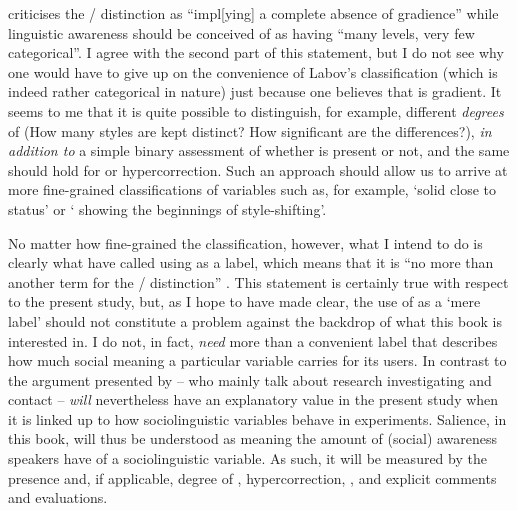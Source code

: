\textcite[6]{racz2013} criticises the / distinction as ``impl[ying] a complete absence of gradience'' while linguistic awareness should be conceived of as having ``many levels, very few categorical''.
I agree with the second part of this statement, but I do not see why one would have to give up on the convenience of Labov's classification (which is indeed rather categorical in nature) just because one believes that  is gradient.
It seems to me that it is quite possible to distinguish, for example, different \emph{degrees} of  (How many styles are kept distinct? How significant are the differences?), \emph{in addition to} a simple binary assessment of whether  is present or not, and the same should hold for  or hypercorrection.
Such an approach should allow us to arrive at more fine-grained classifications of variables such as, for example, `solid  close to  status' or ` showing the beginnings of style-shifting'.

No matter how fine-grained the classification, however, what I intend to do is clearly what \textcite{kerswillwilliams2002} have called using \emph{} as a label, which means that it is ``no more than another term for the / distinction'' \parencite[32]{racz2013}.
This statement is certainly true with respect to the present study, but, as I hope to have made clear, the use of  as a `mere label' should not constitute a problem against the backdrop of what this book is interested in.
I do not, in fact, \emph{need} more than a convenient label that describes how much social meaning a particular variable carries for its users.
In contrast to the argument presented by \textcite{kerswillwilliams2002} -- who mainly talk about research investigating  and contact --  \emph{will} nevertheless have an explanatory value in the present study when it is linked up to how sociolinguistic variables behave in  experiments.
Salience, in this book, will thus be understood as meaning the amount of (social) awareness speakers have of a sociolinguistic variable.
As such, it will be measured by the presence and, if applicable, degree of , hypercorrection, , and explicit comments and evaluations.

